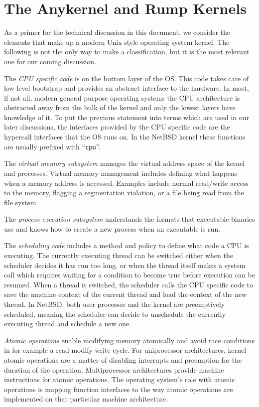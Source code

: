 %

\section{The Anykernel and Rump Kernels}
\label{chap:concept}

As a primer for the technical discussion in this document, we
consider the elements that make up a modern Unix-style operating system
kernel.  The following is not the only way to make a classification,
but it is the most relevant one for our coming discussion.

The \textit{CPU specific code} is on the bottom layer of the
OS.  This code takes care of low level bootstrap and provides an
abstract interface to the hardware.  In most, if not all, modern
general purpose operating systems the CPU architecture is abstracted away
from the bulk of the kernel and only the lowest layers have knowledge
of it.  To put the previous statement into terms which are used in our
later discussions, the interfaces provided by the CPU specific code are
the hypercall interfaces that the OS runs on.  In the NetBSD
kernel these functions are usually prefixed with ``\texttt{cpu}''.

The \textit{virtual memory subsystem} manages the virtual address space of
the kernel and processes.  Virtual memory management includes defining what
happens when a memory address is accessed.  Examples include
normal read/write access to the memory, flagging a segmentation violation,
or a file being read from the file system.

The \textit{process execution subsystem} understands the formats that
executable binaries use and knows how to create a new process when an
executable is run.

The \textit{scheduling code} includes a method and policy to define what
code a CPU is executing.  The currently executing thread can be switched
either when the scheduler decides it has run too long, or when the thread
itself makes a system call which requires waiting for a condition to
become true before execution can be resumed.  When a thread is switched,
the scheduler calls the CPU specific code to save the machine context of
the current thread and load the context of the new thread.  In NetBSD,
both user processes and the kernel are preemptively scheduled, meaning
the scheduler can decide to unschedule the currently executing thread
and schedule a new one.

\textit{Atomic operations} enable modifying memory atomically and
avoid race conditions in for example a read-modify-write cycle.
For uniprocessor architectures, kernel atomic operations are a matter of
disabling interrupts and preemption for the duration of the operation.
Multiprocessor architectures provide machine instructions for atomic
operations.  The operating system's role with atomic operations is mapping
function interfaces to the way atomic operations are implemented on that
particular machine architecture.

